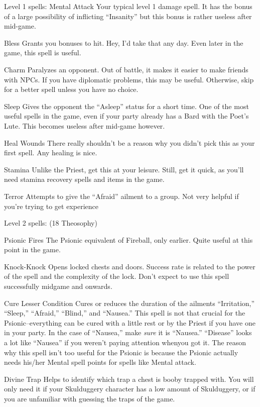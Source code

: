 \documentclass[12pt]{article}
\begin{document}
Level 1 spells: Mental Attack Your typical level 1 damage spell. It has
the bonus of a large possibility of inflicting ``Insanity'' but this
bonus is rather useless after mid-game.

Bless Grants you bonuses to hit. Hey, I'd take that any day. Even later
in the game, this spell is useful.

Charm Paralyzes an opponent. Out of battle, it makes it easier to make
friends with NPCs. If you have diplomatic problems, this may be useful.
Otherwise, skip for a better spell unless you have no choice.

Sleep Gives the opponent the ``Asleep'' status for a short time. One of
the most useful spells in the game, even if your party already has a
Bard with the Poet's Lute. This becomes useless after mid-game however.

Heal Wounds There really shouldn't be a reason why you didn't pick this
as your first spell. Any healing is nice.

Stamina Unlike the Priest, get this at your leisure. Still, get it
quick, as you'll need stamina recovery spells and items in the game.

Terror Attempts to give the ``Afraid'' ailment to a group. Not very
helpful if you're trying to get experience

Level 2 spells: (18 Theosophy)

Psionic Fires The Psionic equivalent of Fireball, only earlier. Quite
useful at this point in the game.

Knock-Knock Opens locked chests and doors. Success rate is related to
the power of the spell and the complexity of the lock. Don't expect to
use this spell successfully midgame and onwards.

Cure Lesser Condition Cures or reduces the duration of the ailments
``Irritation,'' ``Sleep,'' ``Afraid,'' ``Blind,'' and ``Nausea.'' This
spell is not that crucial for the Psionic--everything can be cured with
a little rest or by the Priest if you have one in your party. In the
case of ``Nausea,'' make \emph{sure} it is ``Nausea.'' ``Disease'' looks
a lot like ``Nausea'' if you weren't paying attention whenyou got it.
The reason why this spell isn't too useful for the Psionic is because
the Psionic actually needs his/her Mental spell points for spells like
Mental attack.

Divine Trap Helps to identify which trap a chest is booby trapped with.
You will only need it if your Skulduggery character has a low amount of
Skulduggery, or if you are unfamiliar with guessing the traps of the
game.
\end{document}
